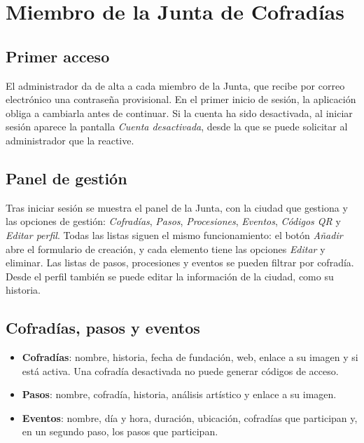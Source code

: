 \section{Miembro de la Junta de Cofradías}\label{sec:manualJunta}

\subsection{Primer acceso}

El administrador da de alta a cada miembro de la Junta, que recibe por correo electrónico una contraseña provisional. En el primer inicio de sesión, la aplicación obliga a cambiarla antes de continuar. Si la cuenta ha sido desactivada, al iniciar sesión aparece la pantalla \emph{Cuenta desactivada}, desde la que se puede solicitar al administrador que la reactive.

\subsection{Panel de gestión}

Tras iniciar sesión se muestra el panel de la Junta, con la ciudad que gestiona y las opciones de gestión: \emph{Cofradías}, \emph{Pasos}, \emph{Procesiones}, \emph{Eventos}, \emph{Códigos QR} y \emph{Editar perfil}. Todas las listas siguen el mismo funcionamiento: el botón \emph{Añadir} abre el formulario de creación, y cada elemento tiene las opciones \emph{Editar} y eliminar. Las listas de pasos, procesiones y eventos se pueden filtrar por cofradía. Desde el perfil también se puede editar la información de la ciudad, como su historia.

\subsection{Cofradías, pasos y eventos}

\begin{itemize}
    \item \textbf{Cofradías}: nombre, historia, fecha de fundación, web, enlace a su imagen y si está activa. Una cofradía desactivada no puede generar códigos de acceso.
    \item \textbf{Pasos}: nombre, cofradía, historia, análisis artístico y enlace a su imagen.
    \item \textbf{Eventos}: nombre, día y hora, duración, ubicación, cofradías que participan y, en un segundo paso, los pasos que participan.
\end{itemize}

